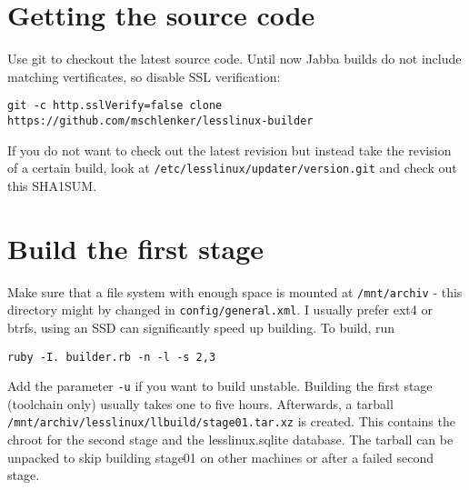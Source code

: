 
\section{Getting the source code}

Use git to checkout the latest source code. Until now Jabba builds do not include matching vertificates, so disable SSL verification:

\begin{verbatim}
git -c http.sslVerify=false clone https://github.com/mschlenker/lesslinux-builder 
\end{verbatim}

If you do not want to check out the latest revision but instead take the revision of a certain build, look at \texttt{/etc/lesslinux/updater/version.git} and check out this SHA1SUM.

\section{Build the first stage}

Make sure that a file system with enough space is mounted at \texttt{/mnt/archiv} - this directory might by changed in \texttt{config/general.xml}. I usually prefer ext4 or btrfs, using an SSD can significantly speed up building. To build, run 

\begin{verbatim}
ruby -I. builder.rb -n -l -s 2,3
\end{verbatim}

Add the parameter \texttt{-u} if you want to build unstable. Building the first stage (toolchain only) usually takes one to five hours. Afterwards, a tarball \texttt{/mnt/archiv/lesslinux/llbuild/stage01.tar.xz} is created. This contains the chroot for the second stage and the lesslinux.sqlite database. The tarball can be unpacked to skip building stage01 on other machines or after a failed second stage.



